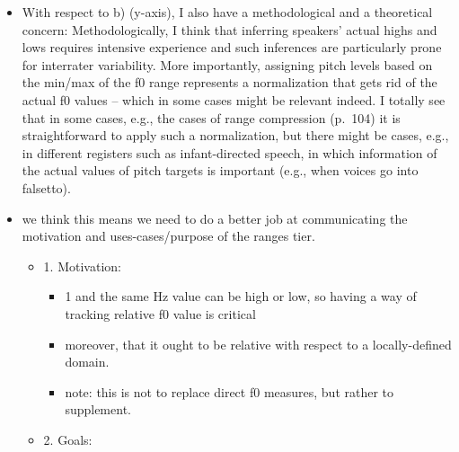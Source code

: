 \documentclass[11pt, twoside]{memoir}
\begin{document}
\begin{itemize}
\begin{itemize}
\begin{itemize}
\begin{itemize}
        \begin{itemize}
        \tightlist
        \item
          a big point here: there is no 1 English intonation. no 1
          Mainstream American English intonation. there is so much
          variation; we want to build a system that captures any
          possibly of language/dialect/register.\\
        \end{itemize}
      \end{itemize}
    \end{itemize}
  \end{itemize}
\item
  With respect to b) (y-axis), I also have a methodological and a
  theoretical concern: Methodologically, I think that inferring
  speakers' actual highs and lows requires intensive experience and such
  inferences are particularly prone for interrater variability. More
  importantly, assigning pitch levels based on the min/max of the f0
  range represents a normalization that gets rid of the actual f0 values
  -- which in some cases might be relevant indeed. I totally see that in
  some cases, e.g., the cases of range compression (p.~104) it is
  straightforward to apply such a normalization, but there might be
  cases, e.g., in different registers such as infant-directed speech, in
  which information of the actual values of pitch targets is important
  (e.g., when voices go into falsetto).\\
\item
  we think this means we need to do a better job at communicating the
  motivation and uses-cases/purpose of the ranges tier.

  \begin{itemize}
  \tightlist
  \item
    1. Motivation:

    \begin{itemize}
    \tightlist
    \item
      1 and the same Hz value can be high or low, so having a way of
      tracking relative f0 value is critical\\
    \item
      moreover, that it ought to be relative with respect to a
      locally-defined domain.\\
    \item
      note: this is not to replace direct f0 measures, but rather to
      supplement.\\
    \end{itemize}
  \item
    2. Goals:


\end{itemize}
\end{itemize}
\end{document}
